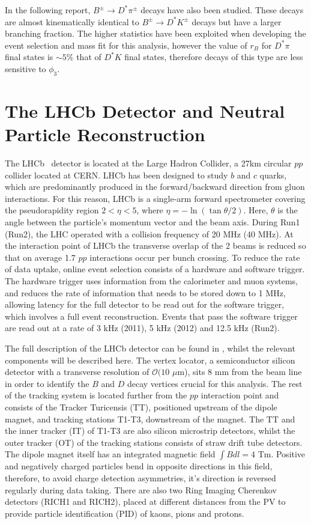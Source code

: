 \documentclass[oneside,12pt]{article}
\begin{document}
In the following report, $B^{\pm}\rightarrow D^{*}\pi^{\pm}$ decays have also
been studied. These decays are almost kinematically identical to
$B^{\pm}\rightarrow D^{*}K^{\pm}$ decays but have a larger branching fraction.
The higher statistics have been exploited when developing the event selection
and mass fit for this analysis, however the value of $r_B$ for $D^*\pi$ final
states is $\sim 5\%$ that of $D^*K$ final states, therefore decays of this
type are less sensitive to $\phi_3$.

\section{The LHCb Detector and Neutral Particle Reconstruction} \label{detector}
The LHCb~\cite{LHCbDetector} detector is located at the Large Hadron Collider,
a 27km circular $pp$ collider located at CERN. LHCb has been designed to study
$b$ and $c$ quarks, which are predominantly produced in the forward/backward
direction from gluon interactions. For this reason, LHCb is a single-arm
forward spectrometer covering the pseudorapidity region $2 < \eta < 5$, where
$\eta = -\ln (\tan \theta / 2)$. Here, $\theta$ is the angle between the
particle's momentum vector and the beam axis. During Run1 (Run2), the LHC
operated with a collision frequency of 20 MHz (40 MHz). At the interaction
point of LHCb the transverse overlap of the 2 beams is reduced so that on
average 1.7 $pp$ interactions occur per bunch crossing. To reduce the rate of
data uptake, online event selection consists of a hardware and software
trigger. The hardware trigger uses information from the calorimeter and muon
systems, and reduces the rate of information that needs to be stored down to 1
MHz, allowing latency for the full detector to be read out for the software
trigger, which involves a full event reconstruction. Events that pass the
software trigger are read out at a rate of 3 kHz (2011), 5 kHz (2012) and 12.5
kHz (Run2).

The full description of the LHCb detector can be found in \cite{LHCbDetector},
whilst the relevant components will be described here.  The vertex locator, a
semiconductor silicon detector with a transverse resolution of $\mathcal{O}(10$
$\mu$m), sits $8$ mm from the beam line in order to identify the $B$ and $D$
decay vertices crucial for this analysis. The rest of the tracking system is
located further from the $pp$ interaction point and consists of the Tracker
Turicensis (TT), positioned upstream of the dipole magnet, and tracking stations
T1-T3, downstream of the magnet. The TT and the inner tracker (IT) of T1-T3 are
also silicon microstrip detectors, whilst the outer tracker (OT) of the tracking
stations consists of straw drift tube detectors. The dipole magnet itself has an
integrated magnetic field $\int B dl = 4$ Tm.  Positive and negatively charged
particles bend in opposite directions in this field, therefore, to avoid charge
detection asymmetries, it's direction is reversed regularly during data taking.
There are also two Ring Imaging Cherenkov detectors (RICH1 and RICH2), placed at
different distances from the PV to provide particle identification (PID) of
kaons, pions and protons.
\end{document}
